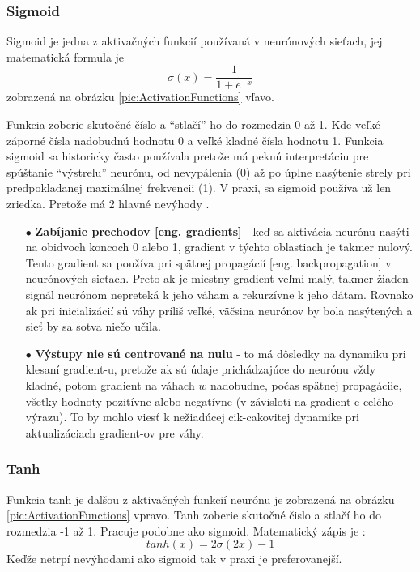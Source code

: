 \subsubsection{Sigmoid}
Sigmoid je jedna z aktivačných funkcií používaná v neurónových sieťach, jej matematická formula je
\begin{equation}
    \sigma(x) = \frac{1}{1 + e^{-x}}
\end{equation}
zobrazená na obrázku \ref{pic:ActivationFunctions} vľavo.

Funkcia zoberie skutočné číslo a ``stlačí'' ho do rozmedzia 0 až 1.
Kde veľké záporné čísla nadobudnú hodnotu 0 a veľké kladné čísla hodnotu 1.
Funkcia sigmoid sa historicky často používala pretože má peknú interpretáciu pre spúštanie ``výstrelu'' neurónu,
    od nevypálenia (0) až po úplne nasýtenie strely pri predpokladanej maximálnej frekvencii (1).
V praxi, sa sigmoid používa už len zriedka.
Pretože má 2 hlavné nevýhody \cite{odkaz:ConvolutionalNeuralNetworkCS231n}.
\begin{enumerate}
    \item[$\bullet$] \textbf{Zabíjanie prechodov [eng. gradients]} - keď sa aktivácia neurónu nasýti na obidvoch koncoch 0 alebo 1, gradient v týchto oblastiach je takmer nulový.
    Tento gradient sa používa pri spätnej propagácií [eng. backpropagation] v neurónových sieťach. Preto ak je miestny gradient veľmi malý, takmer žiaden signál
    neurónom nepreteká k jeho váham a rekurzívne k jeho dátam. Rovnako ak pri inicializácií sú váhy príliš veľké, väčsina neurónov by bola nasýtených a sieť by sa sotva niečo učila.
    \item[$\bullet$] \textbf{Výstupy nie sú centrované na nulu} - to má dôsledky na dynamiku pri klesaní gradient-u, pretože ak sú údaje prichádzajúce do neurónu vždy kladné,
    potom gradient na váhach $w$ nadobudne, počas spätnej propagáciie, všetky hodnoty pozitívne alebo negatívne (v závisloti na gradient-e celého výrazu).
    To by mohlo viesť k nežiadúcej cik-cakovitej dynamike pri aktualizáciach gradient-ov pre váhy.
\end{enumerate}


\subsubsection{Tanh}
Funkcia tanh je dalšou z aktivačných funkcií neurónu je zobrazená na obrázku \ref{pic:ActivationFunctions} vpravo.
Tanh zoberie skutočné čislo a stlačí ho do rozmedzia -1 až 1. Pracuje podobne ako sigmoid.
Matematický zápis je \cite{odkaz:ConvolutionalNeuralNetworkCS231n}:
\begin{equation}
    tanh(x) = 2\sigma(2x) - 1
\end{equation}
Keďže netrpí nevýhodami ako sigmoid tak v praxi je preferovanejší.


